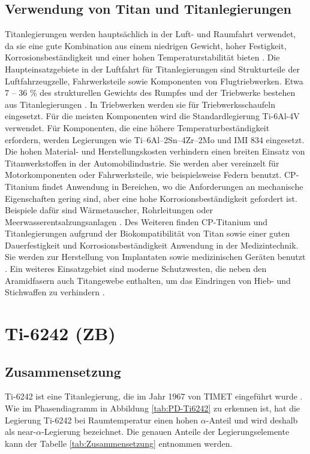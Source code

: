 \subsection{Verwendung von Titan und Titanlegierungen}
Titanlegierungen werden hauptsächlich in der Luft- und Raumfahrt verwendet, da sie eine gute Kombination aus einem niedrigen Gewicht, hoher Festigkeit, Korrosionsbeständigkeit und einer hohen Temperaturstabilität bieten \cite{C.Leyens.2005,R.R.Boyer.1996,M.PetersJ.KumpfertC.WardC.Leyens.2003}. Die Haupteinsatzgebiete in der Luftfahrt für Titanlegierungen sind Strukturteile der Luftfahrzeugzelle, Fahrwerksteile sowie Komponenten von Flugtriebwerken. Etwa 7 -- 36 \% des strukturellen Gewichts des Rumpfes und der Triebwerke bestehen aus Titanlegierungen \cite{Lutjering.2007}. In Triebwerken werden sie für Triebwerksschaufeln eingesetzt. Für die meisten Komponenten wird die Standardlegierung Ti-6Al-4V verwendet. Für Komponenten, die eine höhere Temperaturbeständigkeit erfordern, werden Legierungen wie Ti–6Al–2Sn–4Zr–2Mo und IMI 834 eingesetzt. Die hohen Material- und Herstellungskosten verhindern einen breiten Einsatz von Titanwerkstoffen in der Automobilindustrie. Sie werden aber vereinzelt für Motorkomponenten oder Fahrwerksteile, wie beispielsweise Federn benutzt. CP-Titanium findet Anwendung in Bereichen, wo die Anforderungen an mechanische Eigenschaften gering sind, aber eine hohe Korrosionsbeständigkeit gefordert ist. Beispiele dafür sind Wärmetauscher, Rohrleitungen oder Meerwasserentsalzungsanlagen \cite{A.D.Khawajia.2008}. Des Weiteren finden CP-Titanium und Titanlegierungen aufgrund der Biokompatibilität von Titan sowie einer guten Dauerfestigkeit und Korrosionsbeständigkeit Anwendung in der Medizintechnik. Sie werden zur Herstellung von Implantaten sowie medizinischen Geräten benutzt \cite{M.GeethaA.K.SinghR.AsokamaniA.K.Gogia.2009}. Ein weiteres Einsatzgebiet sind moderne Schutzwesten, die neben den Aramidfasern auch Titangewebe enthalten, um das Eindringen von Hieb- und Stichwaffen zu verhindern \cite{C.Leyens.2005}.  

\section{Ti-6242 (ZB)}

\subsection{Zusammensetzung}

Ti-6242 ist eine Titanlegierung, die im Jahr 1967 von TIMET eingeführt wurde \cite{ImmanuelFreiherrvonThungen.}. 
Wie im Phasendiagramm in Abbildung \ref{tab:PD-Ti6242} zu erkennen ist, hat die Legierung Ti-6242 bei Raumtemperatur einen hohen $\alpha$-Anteil und wird deshalb als near-$\alpha$-Legierung bezeichnet.
Die genauen Anteile der Legierungselemente kann der Tabelle \ref{tab:Zusammensetzung} entnommen werden. 


